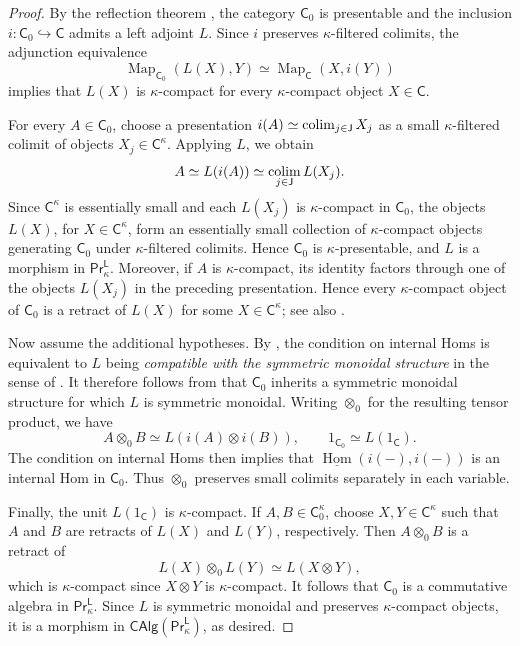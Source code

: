 \begin{proof}
    By the reflection theorem \cite[Thm.~1.1]{reflectionprinciple}, the category $\mathsf{C}_0$ is presentable and the inclusion $i\colon \mathsf{C}_0\hookrightarrow\mathsf{C}$ admits a left adjoint $L$. Since $i$ preserves $\kappa$-filtered colimits, the adjunction equivalence
\[\operatorname{Map}_{\mathsf{C}_0}(L(X),Y)\simeq\operatorname{Map}_{\mathsf{C}}(X,i(Y))\]
implies that $L(X)$ is $\kappa$-compact for every $\kappa$-compact object $X\in\mathsf{C}$.

For every $A\in\mathsf{C}_0$, choose a presentation $i(A)\simeq\operatornamewithlimits{colim}_{j\in\mathsf{J}}X_j$ as a small $\kappa$-filtered colimit of objects $X_j\in\mathsf{C}^\kappa$. Applying $L$, we obtain
\[A\simeq L(i(A))\simeq\operatornamewithlimits{colim}_{j\in\mathsf{J}}L(X_j).\]
Since $\mathsf{C}^\kappa$ is essentially small and each $L(X_j)$ is $\kappa$-compact in $\mathsf{C}_0$, the objects $L(X)$, for $X\in\mathsf{C}^\kappa$, form an essentially small collection of $\kappa$-compact objects generating $\mathsf{C}_0$ under $\kappa$-filtered colimits. Hence $\mathsf{C}_0$ is $\kappa$-presentable, and $L$ is a morphism in $\mathsf{Pr}^{\mathsf{L}}_\kappa$. Moreover, if $A$ is $\kappa$-compact, its identity factors through one of the objects $L(X_j)$ in the preceding presentation. Hence every $\kappa$-compact object of $\mathsf{C}_0$ is a retract of $L(X)$ for some $X\in\mathsf{C}^\kappa$; see also \cite[Cor.~5.5.7.3]{lurie2009HTT}.

Now assume the additional hypotheses. By \cite[Lem.~7.5]{reflectionprinciple}, the condition on internal Homs is equivalent to $L$ being \emph{compatible with the symmetric monoidal structure} in the sense of \cite[Def.~2.2.1.6]{higheralgebra}. It therefore follows from \cite[Prop.~2.2.1.9]{higheralgebra} that $\mathsf{C}_0$ inherits a symmetric monoidal structure for which $L$ is symmetric monoidal. Writing $\otimes_0$ for the resulting tensor product, we have
\[A\otimes_0 B\simeq L(i(A)\otimes i(B)), \qquad 1_{\mathsf{C}_0}\simeq L(1_{\mathsf{C}}).\]
The condition on internal Homs then implies that $\underline{\operatorname{Hom}}(i(-),i(-))$ is an internal Hom in $\mathsf{C}_0$. Thus $\otimes_0$ preserves small colimits separately in each variable.

Finally, the unit $L(1_{\mathsf{C}})$ is $\kappa$-compact. If $A,B\in\mathsf{C}_0^\kappa$, choose $X,Y\in\mathsf{C}^\kappa$ such that $A$ and $B$ are retracts of $L(X)$ and $L(Y)$, respectively. Then $A\otimes_0 B$ is a retract of
\[L(X)\otimes_0 L(Y)\simeq L(X\otimes Y),\]
which is $\kappa$-compact since $X\otimes Y$ is $\kappa$-compact. It follows that $\mathsf{C}_0$ is a commutative algebra in $\mathsf{Pr}^{\mathsf{L}}_\kappa$. Since $L$ is symmetric monoidal and preserves $\kappa$-compact objects, it is a morphism in $\mathsf{CAlg}(\mathsf{Pr}^{\mathsf{L}}_\kappa)$, as desired.
\end{proof}

